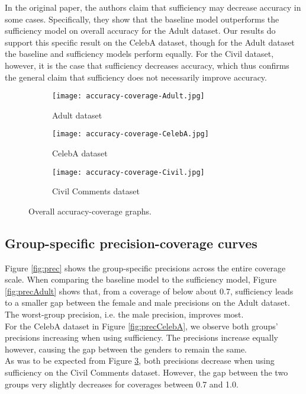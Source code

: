 In the original paper, the authors claim that sufficiency may decrease accuracy in some cases. Specifically, they show that the baseline model outperforms the sufficiency model on overall accuracy for the Adult dataset. Our results do support this specific result on the CelebA dataset, though for the Adult dataset the baseline and sufficiency models perform equally. For the Civil dataset, however, it is the case that sufficiency decreases accuracy, which thus confirms the general claim that sufficiency does not necessarily improve accuracy.
\begin{figure}[!h]
     \centering
     \begin{subfigure}[b]{0.32\textwidth}
         \centering
         \texttt{[image: accuracy-coverage-Adult.jpg]}
         \caption{Adult dataset}
         \label{fig:accAdult}
     \end{subfigure}
     \hfill
     \begin{subfigure}[b]{0.32\textwidth}
         \centering
         \texttt{[image: accuracy-coverage-CelebA.jpg]}
         \caption{CelebA dataset}
         \label{fig:accCelebA}
     \end{subfigure}
     \hfill
     \begin{subfigure}[b]{0.32\textwidth}
         \centering
         \texttt{[image: accuracy-coverage-Civil.jpg]}
         \caption{Civil Comments dataset}
         \label{fig:accCivil}
     \end{subfigure}
        \caption{Overall accuracy-coverage graphs.}
        \label{fig:acc}
\end{figure}

\subsection{Group-specific precision-coverage curves}
Figure \ref{fig:prec} shows the group-specific precisions across the entire coverage scale. When comparing the baseline model to the sufficiency model, Figure \ref{fig:precAdult} shows that, from a coverage of below about 0.7, sufficiency leads to a smaller gap between the female and male precisions on the Adult dataset. The worst-group precision, i.e. the male precision, improves most.\\
For the CelebA dataset in Figure \ref{fig:precCelebA}, we observe both groups' precisions increasing when using sufficiency. The precisions increase equally however, causing the gap between the genders to remain the same.\\
As was to be expected from Figure \ref{fig:accCivil}, both precisions decrease when using sufficiency on the Civil Comments dataset. However, the gap between the two groups very slightly decreases for coverages between 0.7 and 1.0.

